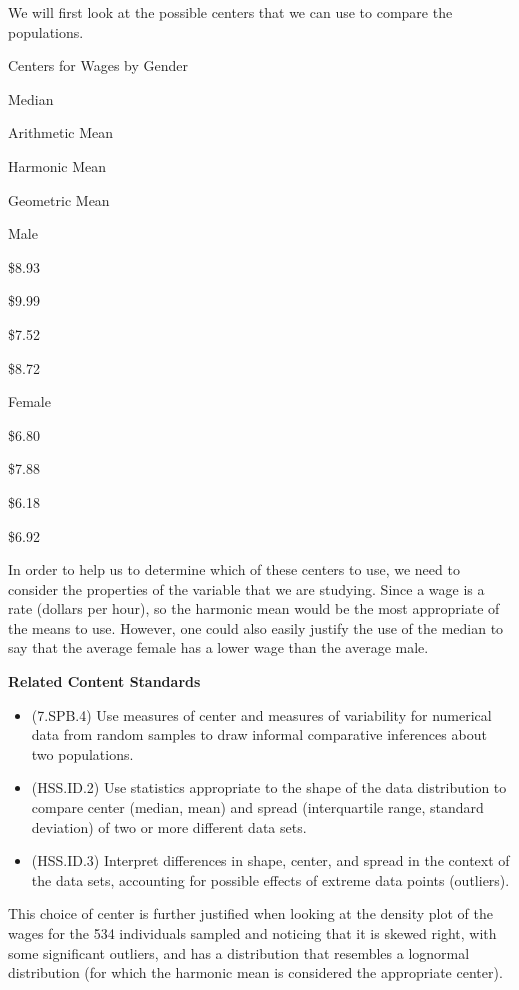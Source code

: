 \documentclass[
]{book}
\providecommand{\tightlist}{%
  \setlength{\itemsep}{0pt}\setlength{\parskip}{0pt}}
\newenvironment{standards}{}{}
\theoremstyle{definition}
\theoremstyle{definition}
\theoremstyle{definition}
\theoremstyle{definition}
\theoremstyle{remark}
\begin{document}
We will first look at the possible centers that we can use to compare the populations.

\label{tab:unnamed-chunk-193}Centers for Wages by Gender

Median

Arithmetic Mean

Harmonic Mean

Geometric Mean

Male

\$8.93

\$9.99

\$7.52

\$8.72

Female

\$6.80

\$7.88

\$6.18

\$6.92

In order to help us to determine which of these centers to use, we need to consider the properties of the variable that we are studying. Since a wage is a rate (dollars per hour), so the harmonic mean would be the most appropriate of the means to use. However, one could also easily justify the use of the median to say that the average female has a lower wage than the average male.

\begin{standards}

\begin{center}
\textbf{Related Content Standards}

\end{center}

\begin{itemize}
\tightlist
\item
  (7.SPB.4) Use measures of center and measures of variability for numerical data from random samples to draw informal comparative inferences about two populations.
\item
  (HSS.ID.2) Use statistics appropriate to the shape of the data distribution to compare center (median, mean) and spread (interquartile range, standard deviation) of two or more different data sets.
\item
  (HSS.ID.3) Interpret differences in shape, center, and spread in the context of the data sets, accounting for possible effects of extreme data points (outliers).
\end{itemize}

\end{standards}

This choice of center is further justified when looking at the density plot of the wages for the 534 individuals sampled and noticing that it is skewed right, with some significant outliers, and has a distribution that resembles a lognormal distribution (for which the harmonic mean is considered the appropriate center).
\end{document}
